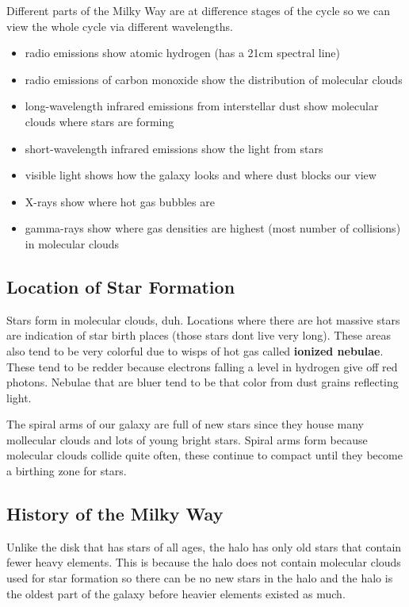 \documentclass[12pt]{article}
\begin{document}
Different parts of the Milky Way are at difference stages of the cycle so we can view the whole cycle via different wavelengths.

\begin{itemize}
    \item radio emissions show atomic hydrogen (has a 21cm spectral line)
    \item radio emissions of carbon monoxide show the distribution of molecular clouds
    \item long-wavelength infrared emissions from interstellar dust show molecular clouds where stars are forming
    \item short-wavelength infrared emissions show the light from stars
    \item visible light shows how the galaxy looks and where dust blocks our view
    \item X-rays show where hot gas bubbles are
    \item gamma-rays show where gas densities are highest (most number of collisions) in molecular clouds
\end{itemize}

\subsection{Location of Star Formation}
Stars form in molecular clouds, duh. Locations where there are hot massive stars are indication of star birth places (those stars dont live very long). These areas also tend to be very colorful due to wisps of hot gas called \textbf{ionized nebulae}. These tend to be redder because electrons falling a level in hydrogen give off red photons. Nebulae that are bluer tend to be that color from dust grains reflecting light.

The spiral arms of our galaxy are full of new stars since they house many mollecular clouds and lots of young bright stars. Spiral arms form because molecular clouds collide quite often, these continue to compact until they become a birthing zone for stars.

\subsection{History of the Milky Way}
Unlike the disk that has stars of all ages, the halo has only old stars that contain fewer heavy elements. This is because the halo does not contain molecular clouds used for star formation so there can be no new stars in the halo and the halo is the oldest part of the galaxy before heavier elements existed as much.
\end{document}
